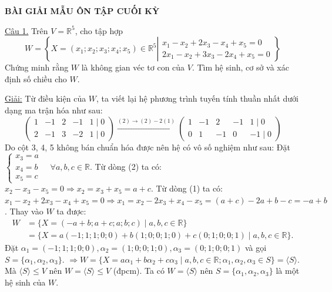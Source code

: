 \documentclass[12pt,a4paper]{article}
\newcommand{\R}{\mathbb{R}}
\begin{document}
\begin{center}
\Large\textbf{BÀI GIẢI MẪU ÔN TẬP CUỐI KỲ}
\end{center}

\underline{Câu 1.} Trên $V=\R^5$, cho tập hợp
\[
W = \left\{ X = (x_1; x_2; x_3; x_4; x_5) \in \R^5 \left| \begin{matrix} x_1 - x_2 + 2x_3 - x_4 + x_5 = 0 \\ 2x_1 - x_2 + 3x_3 - 2x_4 + x_5 = 0 \end{matrix} \right. \right\}
\]
Chứng minh rằng $W$ là không gian véc tơ con của $V$. Tìm hệ sinh, cơ sở và xác định số chiều cho $W$.

\underline{Giải:}
Từ điều kiện của $W$, ta viết lại hệ phương trình tuyến tính thuần nhất dưới dạng ma trận hóa như sau:
\[
\begin{pmatrix} 
1 & -1 & 2 & -1 & 1 \mid 0 \\ 
2 & -1 & 3 & -2 & 1 \mid 0 
\end{pmatrix}
\xrightarrow{(2) \to (2) - 2(1)}
\begin{pmatrix} 
1 & -1 & 2 & -1 & 1 \mid 0 \\ 
0 & 1 & -1 & 0 & -1 \mid 0 
\end{pmatrix}
\]
Do cột 3, 4, 5 không bán chuẩn hóa được nên hệ có vô số nghiệm như sau:
Đặt $\begin{cases} x_3 = a \\ x_4 = b \\ x_5 = c \end{cases} \quad \forall a, b, c \in \R$.
Từ dòng (2) ta có: $x_2 - x_3 - x_5 = 0 \Rightarrow x_2 = x_3 + x_5 = a + c$.
Từ dòng (1) ta có: $x_1 - x_2 + 2x_3 - x_4 + x_5 = 0 \Rightarrow x_1 = x_2 - 2x_3 + x_4 - x_5 = (a+c) - 2a + b - c = -a + b$.
Thay vào $W$ ta được:
\begin{align*}
W &= \{ X = (-a+b; a+c; a; b; c) \mid a, b, c \in \R \} \\
  &= \{ X = a(-1; 1; 1; 0; 0) + b(1; 0; 0; 1; 0) + c(0; 1; 0; 0; 1) \mid a, b, c \in \R \}.
\end{align*}
Đặt $\alpha_1 = (-1; 1; 1; 0; 0), \alpha_2 = (1; 0; 0; 1; 0), \alpha_3 = (0; 1; 0; 0; 1)$ và gọi $S = \{ \alpha_1, \alpha_2, \alpha_3 \}$.
$\Rightarrow W = \{ X = a\alpha_1 + b\alpha_2 + c\alpha_3 \mid a, b, c \in \R; \alpha_1, \alpha_2, \alpha_3 \in S \} = \langle S \rangle$.
Mà $\langle S \rangle \le V$ nên $W = \langle S \rangle \le V$ (đpcm).
Ta có $W = \langle S \rangle$ nên $S = \{ \alpha_1, \alpha_2, \alpha_3 \}$ là một hệ sinh của $W$.
\end{document}
